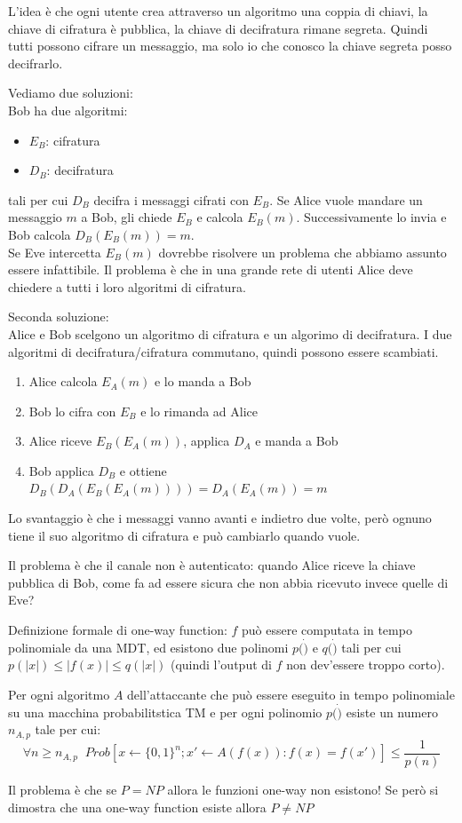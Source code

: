 L'idea è che ogni utente crea attraverso un algoritmo una coppia di chiavi, la chiave di cifratura è pubblica, la chiave di decifratura rimane segreta. Quindi tutti possono cifrare un messaggio, ma solo io che conosco la chiave segreta posso decifrarlo.


Vediamo due soluzioni:\\
Bob ha due algoritmi:
\begin{itemize}
	\item $E_B$: cifratura
	\item $D_B$: decifratura
\end{itemize}
tali per cui $D_B$ decifra i messaggi cifrati con $E_B$.
Se Alice vuole mandare un messaggio $m$ a Bob, gli chiede $E_B$ e calcola $E_B(m)$. Successivamente lo invia e Bob calcola $D_B(E_B(m)) = m$.\\
Se Eve intercetta $E_B(m)$ dovrebbe risolvere un problema che abbiamo assunto essere infattibile.
Il problema è che in una grande rete di utenti Alice deve chiedere a tutti i loro algoritmi di cifratura.

Seconda soluzione:\\
Alice e Bob scelgono un algoritmo di cifratura e un algorimo di decifratura.
I due algoritmi di decifratura/cifratura commutano, quindi possono essere scambiati.
\begin{enumerate}
	\item Alice calcola $E_A(m)$ e lo manda a Bob
	\item Bob lo cifra con $E_B$ e lo rimanda ad Alice
	\item Alice riceve $E_B(E_A(m))$, applica $D_A$ e manda a Bob
	\item Bob applica $D_B$ e ottiene $D_B(D_A(E_B(E_A(m)))) = D_A(E_A(m)) = m$
\end{enumerate}
Lo svantaggio è che i messaggi vanno avanti e indietro due volte, però ognuno tiene il suo algoritmo di cifratura e può cambiarlo quando vuole.

Il problema è che il canale non è autenticato: quando Alice riceve la chiave pubblica di Bob, come fa ad essere sicura che non abbia ricevuto invece quelle di Eve?

Definizione formale di one-way function:
$f$ può essere computata in tempo polinomiale da una MDT, ed esistono due polinomi $p(\dot)$ e $q(\dot)$ tali per cui $p(|x|) \leq |f(x)| \leq q(|x|)$ (quindi l'output di $f$ non dev'essere troppo corto).

Per ogni algoritmo $A$ dell'attaccante che può essere eseguito in tempo polinomiale su una macchina probabilitstica TM e per ogni polinomio $p(\dot)$ esiste un numero $n_{A,p}$ tale per cui:
\begin{equation*}
\forall n \geq n_{A,p} \; \; Prob[x \leftarrow \{0,1\}^n; x'\leftarrow A(f(x)):f(x)=f(x')] \leq \frac1{p(n)}
\end{equation*}

Il problema è che se $P=NP$ allora le funzioni one-way non esistono! Se però si dimostra che una one-way function esiste allora $P \neq NP$